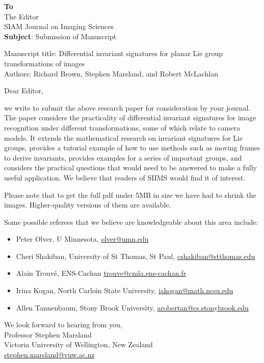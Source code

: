 \documentclass[12pt,a4paper]{letter}
\begin{document}
\thispagestyle{empty}

\textbf{To}
\\
The Editor
\\
SIAM Journal on Imaging Sciences
\\

{\bf Subject}:  Submission of Manuscript

Manuscript title: Differential invariant signatures for planar Lie group transformations of images \\
Authors: Richard Brown, Stephen Marsland, and Robert McLachlan

\vspace{2em}

Dear Editor,

we write to submit the above research paper for consideration by your journal. The paper considers the practicality of differential invariant signatures for image recognition under different transformations, some of which relate to camera models. It extends the mathematical research on invariant signatures for Lie groups, provides a tutorial example of how to use methods such as moving frames to derive invariants, provides examples for a series of important groups, and considers the practical questions that would need to be answered to make a fully useful application. We believe that readers of SIIMS would find it of interest.

Please note that to get the full pdf under 5MB in size we have had to shrink the images. Higher-quality versions of them are available. 

Some possible referees that we believe are knowledgeable about this area include:

\begin{itemize}
\item Peter Olver, U Minnesota,  \url{olver@umn.edu}
\item Cheri Shakiban, University of St Thomas, St Paul, \url{cshakiban@stthomas.edu}
\item Alain Trouv\'{e}, ENS-Cachan \url{ trouve@cmla.ens-cachan.fr}
\item Irina Kogan, North Carloin State University, \url{iakogan@math.ncsu.edu}
\item Allen Tannenbaum, Stony Brook University, \url{arobertan@cs.stonybrook.edu}
\end{itemize}

\closing{We look forward to hearing from you,
\\ Professor Stephen Marsland\\Victoria University of Wellington, New Zealand\\ \url{stephen.marsland@vuw.ac.nz}}
\end{document}
